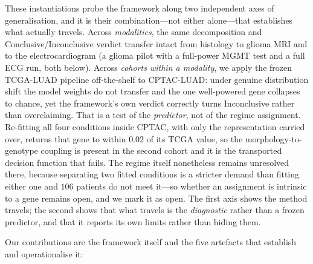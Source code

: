 These instantiations probe the framework along two independent axes of
generalisation, and it is their combination---not either alone---that
establishes what actually travels. Across \emph{modalities}, the same
decomposition and Conclusive/Inconclusive verdict transfer intact from
histology to glioma MRI and to the electrocardiogram (a glioma pilot with a
full-power MGMT test and a full ECG run, both below). Across \emph{cohorts within a modality}, we
apply the frozen TCGA-LUAD pipeline off-the-shelf to CPTAC-LUAD: under
genuine distribution shift the model weights do not transfer and the one
well-powered gene collapses to chance, yet the framework's own verdict
correctly turns Inconclusive rather than overclaiming. That is a test of the
\emph{predictor}, not of the regime assignment. Re-fitting all four conditions
inside CPTAC, with only the representation carried over, returns that gene to
within $0.02$ of its TCGA value, so the morphology-to-genotype coupling is
present in the second cohort and it is the transported decision function that
fails. The regime itself nonetheless remains unresolved there, because
separating two fitted conditions is a stricter demand than fitting either one
and $106$ patients do not meet it---so whether an assignment is
intrinsic to a gene remains open, and we mark it as open. The first
axis shows the method travels; the second shows that what travels is the
\emph{diagnostic} rather than a frozen predictor, and that it reports
its own limits rather than hiding them.

Our contributions are the framework itself and the five artefacts
that establish and operationalise it:

